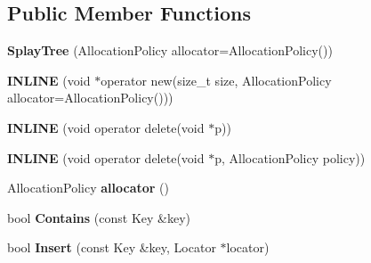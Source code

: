 \subsection*{Public Member Functions}
\begin{DoxyCompactItemize}
\item 
{\bfseries Splay\+Tree} (Allocation\+Policy allocator=Allocation\+Policy())\hypertarget{classv8_1_1internal_1_1_splay_tree_a32079df13e173728baa4e30b22835155}{}\label{classv8_1_1internal_1_1_splay_tree_a32079df13e173728baa4e30b22835155}

\item 
{\bfseries I\+N\+L\+I\+NE} (void $\ast$operator new(size\+\_\+t size,                                                                                                       Allocation\+Policy allocator=Allocation\+Policy()))\hypertarget{classv8_1_1internal_1_1_splay_tree_a6acd8f67e5411dc7a22460cf32afb0e9}{}\label{classv8_1_1internal_1_1_splay_tree_a6acd8f67e5411dc7a22460cf32afb0e9}

\item 
{\bfseries I\+N\+L\+I\+NE} (void operator delete(void $\ast$p))\hypertarget{classv8_1_1internal_1_1_splay_tree_aa82a2181a29f67cab2be46b6acf8d548}{}\label{classv8_1_1internal_1_1_splay_tree_aa82a2181a29f67cab2be46b6acf8d548}

\item 
{\bfseries I\+N\+L\+I\+NE} (void operator delete(void $\ast$p, Allocation\+Policy policy))\hypertarget{classv8_1_1internal_1_1_splay_tree_abe023fb5b9ce3fed7322bbaf756231c0}{}\label{classv8_1_1internal_1_1_splay_tree_abe023fb5b9ce3fed7322bbaf756231c0}

\item 
Allocation\+Policy {\bfseries allocator} ()\hypertarget{classv8_1_1internal_1_1_splay_tree_a1f246b50b6918ac8dd2651817ab43b20}{}\label{classv8_1_1internal_1_1_splay_tree_a1f246b50b6918ac8dd2651817ab43b20}

\item 
bool {\bfseries Contains} (const Key \&key)\hypertarget{classv8_1_1internal_1_1_splay_tree_a2df37e47951b6090ecd2787663a96ab3}{}\label{classv8_1_1internal_1_1_splay_tree_a2df37e47951b6090ecd2787663a96ab3}

\item 
bool {\bfseries Insert} (const Key \&key, Locator $\ast$locator)\hypertarget{classv8_1_1internal_1_1_splay_tree_aeadaecb47733848fb6b6eb835b9a729c}{}\label{classv8_1_1internal_1_1_splay_tree_aeadaecb47733848fb6b6eb835b9a729c}


\end{DoxyCompactItemize}
